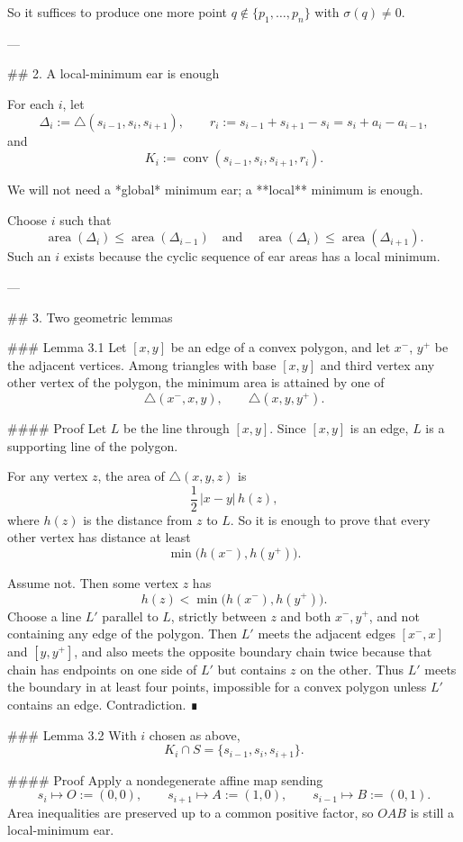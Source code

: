 So it suffices to produce one more point \(q\notin\{p_1,\dots,p_n\}\) with \(\sigma(q)\neq 0\).

---

## 2. A local-minimum ear is enough

For each \(i\), let
\[
\Delta_i:=\triangle(s_{i-1},s_i,s_{i+1}),
\qquad
r_i:=s_{i-1}+s_{i+1}-s_i=s_i+a_i-a_{i-1},
\]
and
\[
K_i:=\operatorname{conv}(s_{i-1},s_i,s_{i+1},r_i).
\]

We will not need a *global* minimum ear; a **local** minimum is enough.

Choose \(i\) such that
\[
\operatorname{area}(\Delta_i)\le \operatorname{area}(\Delta_{i-1})
\quad\text{and}\quad
\operatorname{area}(\Delta_i)\le \operatorname{area}(\Delta_{i+1}).
\]
Such an \(i\) exists because the cyclic sequence of ear areas has a local minimum.

---

## 3. Two geometric lemmas

### Lemma 3.1
Let \([x,y]\) be an edge of a convex polygon, and let \(x^{-}\), \(y^{+}\) be the adjacent vertices. Among triangles with base \([x,y]\) and third vertex any other vertex of the polygon, the minimum area is attained by one of
\[
\triangle(x^{-},x,y),\qquad \triangle(x,y,y^{+}).
\]

#### Proof
Let \(L\) be the line through \([x,y]\). Since \([x,y]\) is an edge, \(L\) is a supporting line of the polygon.

For any vertex \(z\), the area of \(\triangle(x,y,z)\) is
\[
\frac12\,|x-y|\,h(z),
\]
where \(h(z)\) is the distance from \(z\) to \(L\). So it is enough to prove that every other vertex has distance at least
\[
\min\bigl(h(x^-),h(y^+)\bigr).
\]

Assume not. Then some vertex \(z\) has
\[
h(z)<\min\bigl(h(x^-),h(y^+)\bigr).
\]
Choose a line \(L'\) parallel to \(L\), strictly between \(z\) and both \(x^-,y^+\), and not containing any edge of the polygon. Then \(L'\) meets the adjacent edges \([x^-,x]\) and \([y,y^+]\), and also meets the opposite boundary chain twice because that chain has endpoints on one side of \(L'\) but contains \(z\) on the other. Thus \(L'\) meets the boundary in at least four points, impossible for a convex polygon unless \(L'\) contains an edge. Contradiction. ∎

### Lemma 3.2
With \(i\) chosen as above,
\[
K_i\cap S=\{s_{i-1},s_i,s_{i+1}\}.
\]

#### Proof
Apply a nondegenerate affine map sending
\[
s_i\mapsto O:=(0,0),\qquad
s_{i+1}\mapsto A:=(1,0),\qquad
s_{i-1}\mapsto B:=(0,1).
\]
Area inequalities are preserved up to a common positive factor, so \(OAB\) is still a local-minimum ear.


